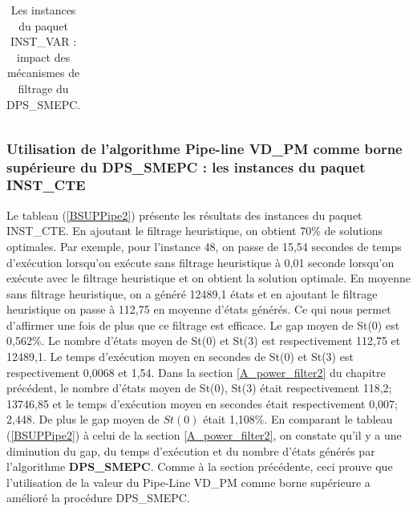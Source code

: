 \begin{table}[H]
\begin{tabular}{|r|rrrr|rrr|}
		\bottomrule
	\end{tabular}%
	\caption{Les instances du paquet INST\_VAR : impact des mécanismes de filtrage du DPS\_SMEPC.}
	\label{BSUPPipe}%
\end{table}%

\subsubsection{Utilisation de l'algorithme \textbf{Pipe-line VD\_PM} comme borne supérieure du DPS\_SMEPC : les instances du paquet INST\_CTE}

Le tableau (\ref{BSUPPipe2}) présente les résultats des instances du paquet INST\_CTE. 
En ajoutant le filtrage heuristique, on obtient 70\% de solutions optimales. Par exemple, pour l'instance 48, on passe de 15,54 secondes de temps d'exécution lorsqu'on exécute sans filtrage heuristique à 0,01 seconde lorsqu'on exécute avec le filtrage heuristique et on obtient la solution optimale. 
En moyenne sans filtrage heuristique, on a généré 12489,1 états et en ajoutant le filtrage heuristique on passe à 112,75 en moyenne d'états générés. Ce qui nous permet d'affirmer une fois de plus que ce filtrage est efficace.
Le gap moyen de St(0)  est 
0,562\%. 
Le nombre d'états moyen de St(0) et St(3) est respectivement 
112,75 et 12489,1. 
Le temps d'exécution moyen en secondes de St(0) et St(3) est respectivement 
0,0068 et 1,54. 
Dans la section \ref{A_power_filter2} du chapitre précédent, le nombre d'états moyen de St(0), St(3) était respectivement 118,2; 13746,85 
et le temps d'exécution moyen en secondes était respectivement 0,007; 2,448. De plus le gap moyen de $St(0)$ était 1,108\%.
En comparant le tableau (\ref{BSUPPipe2}) à celui de la section \ref{A_power_filter2}, on constate qu'il y a une diminution du gap, du temps d'exécution et du nombre d'états générés par l'algorithme \textbf{DPS\_SMEPC}. Comme à la section précédente, ceci prouve que l'utilisation de la valeur du Pipe-Line VD\_PM comme borne supérieure a amélioré la procédure DPS\_SMEPC.


